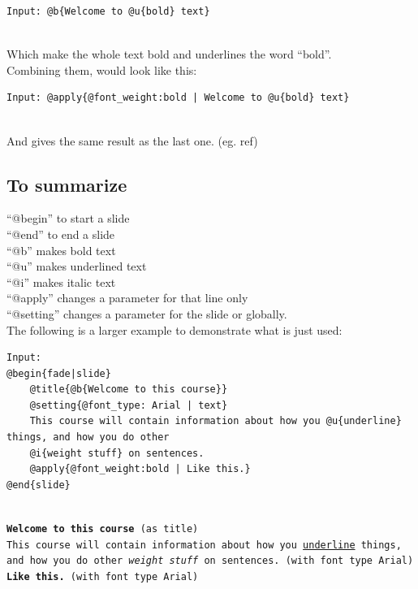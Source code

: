 \begin{lstlisting}[frame=single]
Input: @b{Welcome to @u{bold} text}
\end{lstlisting}

 \\

Which make the whole text bold and underlines the word ``bold''.\\

Combining them, would look like this:\\

\begin{lstlisting}[frame=single]
Input: @apply{@font_weight:bold | Welcome to @u{bold} text}
\end{lstlisting}

 \\

And gives the same result as the last one. (eg. ref)

\subsection*{To summarize}
``@begin'' to start a slide\\
``@end'' to end a slide\\
``@b'' makes bold text \\
``@u'' makes underlined text \\
``@i'' makes italic text \\
``@apply'' changes a parameter for that line only\\
``@setting'' changes a parameter for the slide or globally.\\

The following is a larger example to demonstrate what is just used:\\

\begin{lstlisting}[frame=single]
Input:
@begin{fade|slide}
    @title{@b{Welcome to this course}}
    @setting{@font_type: Arial | text}
    This course will contain information about how you @u{underline} things, and how you do other    
    @i{weight stuff} on sentences.
    @apply{@font_weight:bold | Like this.}
@end{slide}
\end{lstlisting}

\texttt{ \\
\textbf{Welcome to this course} (as title) \\
This course will contain information about how you \underline{underline} things, and how you do other \textit{weight stuff} on sentences. (with font type Arial) \\
\textbf{Like this.}  (with font type Arial)}
\\ \\

